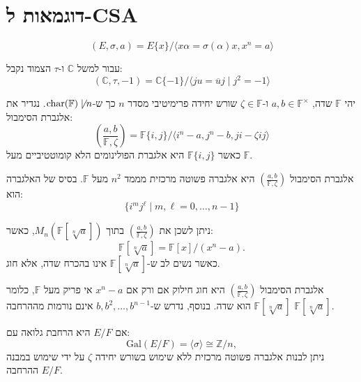 \documentclass{tstextbook}
\begin{document}
\section{דוגמאות ל-CSA}

\begin{definition}
$$(E,\sigma,a)=E\{ x \} / \langle x\alpha= \sigma(\alpha)x,x^{n}=a \rangle $$

\end{definition}
עבור למשל \(\mathbb{C}\) ו-\(\tau\) הצמוד נקבל:
$$(\mathbb{C},\tau,-1)= \mathbb{C}\{ -1 \} / \langle ju = \overline{u} j\mid  j^{2} = -1 \rangle $$

\begin{definition}
יהי \(\mathbb{F}\) שדה, \(a, b \in \mathbb{F}^{\times}\) ו-\(\zeta \in \mathbb{F}\) שורש יחידה פרימיטיבי מסדר \(n\) כך ש-\(\text{char}(\mathbb{F}) \not\mid n\).
נגדיר את אלגברת הסימבול:
$$\left( \frac{a, b}{\mathbb{F}, \zeta} \right) = \mathbb{F}\{i, j\} / \langle i^n - a, j^n - b, ji - \zeta ij \rangle$$
כאשר \(\mathbb{F}\{i, j\}\) היא אלגברת הפולינומים הלא קומוטטיביים מעל \(\mathbb{F}\).

\end{definition}
\begin{proposition}
אלגברת הסימבול \(\left( \frac{a, b}{\mathbb{F}, \zeta} \right)\) היא אלגברה פשוטה מרכזית מממד \(n^2\) מעל \(\mathbb{F}\).
בסיס של האלגברה הוא:
$$\{i^m j^\ell \mid m, \ell = 0, \dots, n-1\}$$

\end{proposition}
\begin{lemma}
ניתן לשכן את \(\left( \frac{a, b}{\mathbb{F}, \zeta} \right)\) בתוך \(M_n(\mathbb{F}[\sqrt[n]{a}])\), כאשר:
$$\mathbb{F}[\sqrt[n]{a}] = \mathbb{F}[x] / (x^n - a).$$
כאשר נשים לב ש-\(\mathbb{F}[\sqrt[n]{a}]\) אינו בהכרח שדה, אלא חוג.

\end{lemma}
\begin{proposition}
אלגברת הסימבול \(\left( \frac{a, b}{\mathbb{F}, \zeta} \right)\) היא חוג חילוק אם ורק אם \(x^n - a\) אי פריק מעל \(\mathbb{F}\), כלומר \(\mathbb{F}[\sqrt[n]{a}]\) הוא שדה.
בנוסף, נדרש ש-\(b, b^2, \dots, b^{n-1}\) אינם נורמות מההרחבה \(\mathbb{F}[\sqrt[n]{a}]\).

\end{proposition}
\begin{proposition}
אם \(E / F\) היא הרחבת גלואה עם:
$$\mathrm{Gal}(E / F) = \langle \sigma \rangle \cong \mathbb{Z} / n,$$
ניתן לבנות אלגברה פשוטה מרכזית ללא שימוש בשורש יחידה \(\zeta\) על ידי שימוש במבנה ההרחבה \(E / F\).

\end{proposition}
\end{document}
